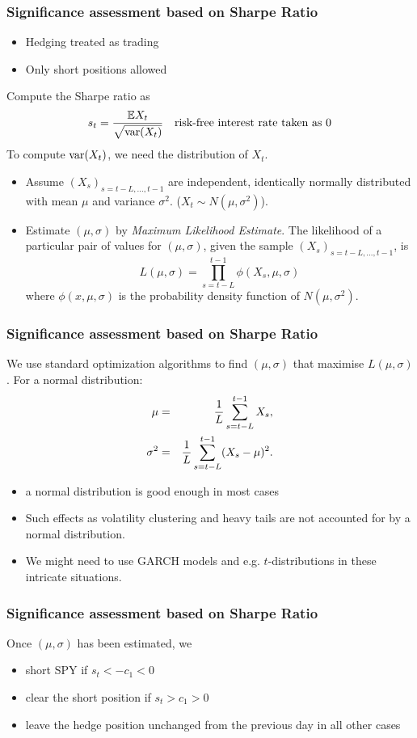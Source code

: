 \documentclass{beamer}
\begin{document}
\begin{frame}
  \frametitle{Significance assessment based on Sharpe Ratio}
  \begin{itemize}
  \item Hedging treated as trading
  \item Only short positions allowed
  \end{itemize}
  Compute the Sharpe ratio as
  \[
    s_t = {\mathbb{E} X_t \over \sqrt{\text{var}(X_t)}}
    \quad
    \text{risk-free interest rate taken as 0}
  \]
  To compute $\text{var}(X_t)$, we need the distribution of $X_t$.
  \begin{itemize}
  \item Assume $(X_s)_{s=t-L,\dots, t-1}$ are independent, identically
    normally distributed with mean $\mu$ and variance $\sigma^2$.
    ($X_t \sim N(\mu, \sigma^2)$).
  \item Estimate $(\mu, \sigma)$ by {\it Maximum Likelihood
      Estimate}. The likelihood of a particular pair of values for
    $(\mu, \sigma)$, given the sample $(X_s)_{s = t-L, \dots, t-1}$,
    is
    \[
      L(\mu, \sigma) = \prod_{s=t-L}^{t-1} \phi(X_s, \mu, \sigma)
    \]
    where $\phi(x, \mu, \sigma)$ is the probability density function
    of $N(\mu, \sigma^2)$.
  \end{itemize}
\end{frame}

\begin{frame}
  \frametitle{Significance assessment based on Sharpe Ratio}
  We use standard optimization algorithms to find $(\mu, \sigma)$ that
  maximise $L(\mu, \sigma)$. For a normal distribution:
\begin{eqnarray*}
  \mu &=& {1 \over L} \sum_{s=t-L}^{t-1} X_s, \\
  \sigma^2 &=& {1 \over L} \sum_{s=t-L}^{t-1} (X_s - \mu)^2.
\end{eqnarray*}
\begin{itemize}
\item a normal distribution is good enough in most cases
\item Such effects as volatility clustering and heavy tails are not
  accounted for by a normal distribution.
\item We might need to use GARCH models and e.g. $t$-distributions in
  these intricate situations.
\end{itemize}
\end{frame}

\begin{frame}
  \frametitle{Significance assessment based on Sharpe Ratio}
  Once $(\mu, \sigma)$ has been estimated, we
  \begin{itemize}
  \item short SPY if $s_t < -c_1 < 0$
  \item clear the short position if $s_t > c_1 > 0$
  \item leave the hedge position unchanged from the previous day in
    all other cases
  \end{itemize}
\end{frame}
\end{document}
